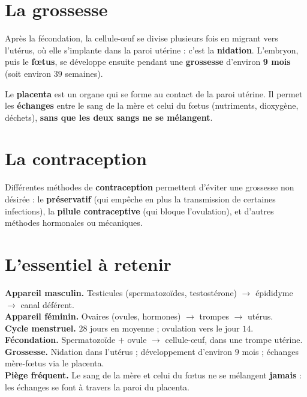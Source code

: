 \section{La grossesse}

\begin{propriete}
Après la fécondation, la cellule-œuf se divise plusieurs fois en migrant vers l'utérus,
où elle s'implante dans la paroi utérine : c'est la \textbf{nidation}. L'embryon, puis le
\textbf{fœtus}, se développe ensuite pendant une \textbf{grossesse} d'environ \textbf{9
mois} (soit environ $39$ semaines).
\end{propriete}

\begin{definition}[Placenta]
Le \textbf{placenta} est un organe qui se forme au contact de la paroi utérine. Il permet
les \textbf{échanges} entre le sang de la mère et celui du fœtus (nutriments, dioxygène,
déchets), \textbf{sans que les deux sangs ne se mélangent}.
\end{definition}

\section{La contraception}

\begin{propriete}
Différentes méthodes de \textbf{contraception} permettent d'éviter une grossesse non
désirée : le \textbf{préservatif} (qui empêche en plus la transmission de certaines
infections), la \textbf{pilule contraceptive} (qui bloque l'ovulation), et d'autres
méthodes hormonales ou mécaniques.
\end{propriete}

\section{L'essentiel à retenir}

\begin{synthese}
\textbf{Appareil masculin.} Testicules (spermatozoïdes, testostérone) $\to$ épididyme
$\to$ canal déférent.\\[4pt]
\textbf{Appareil féminin.} Ovaires (ovules, hormones) $\to$ trompes $\to$ utérus.\\[4pt]
\textbf{Cycle menstruel.} $28$ jours en moyenne ; ovulation vers le jour $14$.\\[4pt]
\textbf{Fécondation.} Spermatozoïde $+$ ovule $\to$ cellule-œuf, dans une trompe
utérine.\\[4pt]
\textbf{Grossesse.} Nidation dans l'utérus ; développement d'environ $9$ mois ; échanges
mère-fœtus via le placenta.\\[4pt]
\textbf{Piège fréquent.} Le sang de la mère et celui du fœtus ne se mélangent
\textbf{jamais} : les échanges se font à travers la paroi du placenta.
\end{synthese}

